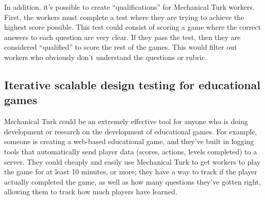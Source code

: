 \documentclass[12pt]{report}
\begin{document}
			In addition, it's possible to create ``qualifications'' for Mechanical Turk workers. First, the workers must complete a test where they are trying to achieve the highest score possible. This test could consist of scoring a game where the correct answers to each question are very clear. If they pass the test, then they are considered ``qualified'' to score the rest of the games. This would filter out workers who obviously don't understand the questions or rubric.

		\subsection{Iterative scalable design testing for educational games}
			
			Mechanical Turk could be an extremely effective tool for anyone who is doing development or research on the development of educational games. For example, someone is creating a web-based educational game, and they've built in logging tools that automatically send player data (scores, actions, levels completed) to a server. They could cheaply and easily use Mechanical Turk to get workers to play the game for at least 10 minutes, or more; they have a way to track if the player actually completed the game, as well as how many questions they've gotten right, allowing them to track how much players have learned.
\end{document}
